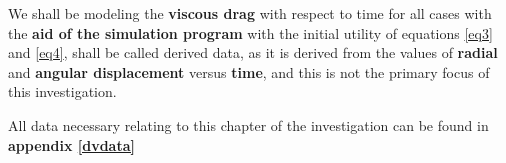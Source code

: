 {We shall be modeling the \textbf{viscous drag} with respect to time for all cases with the \textbf{aid of the simulation program} with the initial utility of equations \ref{eq3} and \ref{eq4}, shall be called derived data, as it is derived from the values of \textbf{radial} and \textbf{angular displacement} versus \textbf{time}, and this is not the primary focus of this investigation.}

{All data necessary relating to this chapter of the investigation can be found in \textbf{appendix \ref{dvdata}}}


